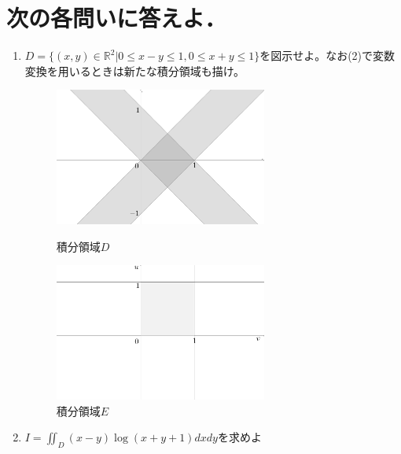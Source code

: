 \documentclass[a4paper,10pt]{jarticle}
\begin{document}
\newpage
\section{次の各問いに答えよ．}
\begin{enumerate}
\item $D=\{(x,y) \in \mathbb{R}^2 | 0 \leq x-y \leq 1, 0 \leq x+y \leq 1\}$を図示せよ。なお(2)で変数変換を用いるときは新たな積分領域も描け。

\begin{figure}[h]\begin{minipage}{0.5\hsize}
	\begin{center}
		\includegraphics[width=70mm,bb  = 0 0 300 200]{31.png}
	\end{center}
 	\caption{積分領域$D$}
\end{minipage}
\begin{minipage}{0.5\hsize}
	\begin{center}
		\includegraphics[width=70mm,bb  = 0 0 300 200]{32.png}
	\end{center}
	\caption{積分領域$E$}
\end{minipage}
\end{figure}

\item$ I = \iint_{D} (x-y)\log{(x+y+1)}dxdy $を求めよ


\end{enumerate}
\end{document}
